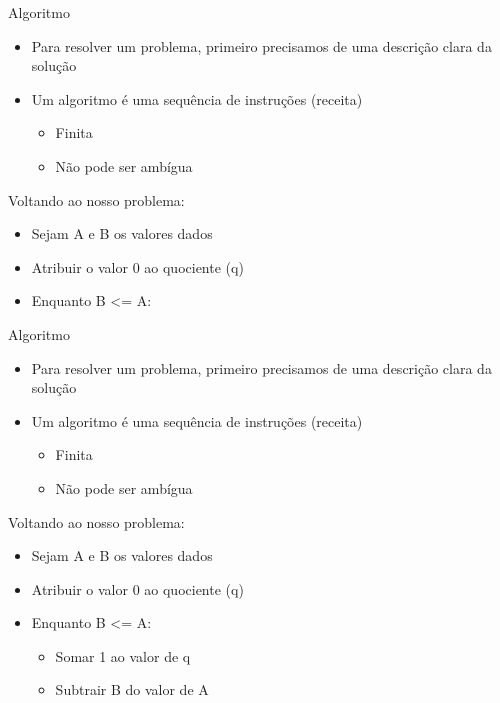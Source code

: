 \documentclass[t, aspectratio=169]{beamer}
\begin{document}
\begin{frame}[label={sec:org1b2b626}]{Algoritmo}
\begin{itemize}
\item Para resolver um problema, primeiro precisamos de uma descrição clara da solução
\item Um algoritmo é uma sequência de instruções (receita)
\begin{itemize}
\item Finita
\item Não pode ser ambígua
\end{itemize}
\end{itemize}

\alert{Voltando ao nosso problema:}

\begin{itemize}
\item Sejam A e B os valores dados
\item Atribuir o valor 0 ao quociente (q)
\item Enquanto \alert{B <= A}:
\end{itemize}
\end{frame}

\begin{frame}[label={sec:orgaa9a71d}]{Algoritmo}
\begin{itemize}
\item Para resolver um problema, primeiro precisamos de uma descrição clara da solução
\item Um algoritmo é uma sequência de instruções (receita)
\begin{itemize}
\item Finita
\item Não pode ser ambígua
\end{itemize}
\end{itemize}

\alert{Voltando ao nosso problema:}

\begin{itemize}
\item Sejam A e B os valores dados
\item Atribuir o valor 0 ao quociente (q)
\item Enquanto \alert{B <= A}:
\begin{itemize}
\item Somar 1 ao valor de q
\item Subtrair B do valor de A
\end{itemize}
\end{itemize}
\end{frame}
\end{document}
